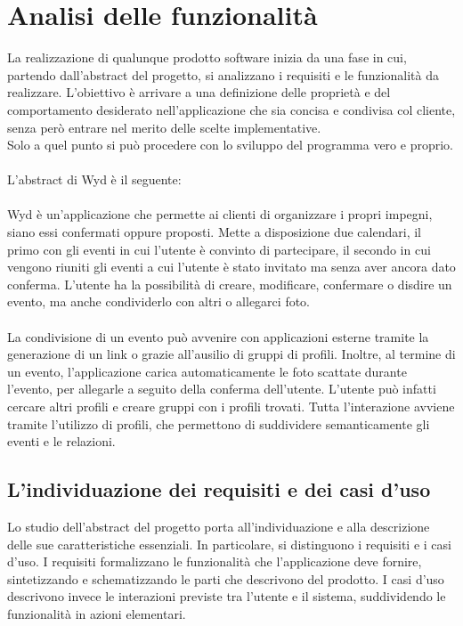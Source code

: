 \chapter{Analisi delle funzionalità}

La realizzazione di qualunque prodotto software inizia da una fase in cui,
partendo dall’abstract del progetto, si analizzano i requisiti e le funzionalità da realizzare.
L’obiettivo è arrivare a una definizione delle proprietà e
del comportamento desiderato nell’applicazione che sia concisa e condivisa col cliente,
senza però entrare nel merito delle scelte implementative.\\
Solo a quel punto si può procedere con lo sviluppo del programma vero e proprio.\\
\\
L'abstract di Wyd è il seguente:\\
\\
Wyd è un'applicazione che permette ai clienti di organizzare i propri impegni,
siano essi confermati oppure proposti.
Mette a disposizione due calendari,
il primo con gli eventi in cui l'utente è convinto di partecipare,
il secondo in cui vengono riuniti gli eventi a cui l'utente è stato invitato ma senza aver ancora dato conferma.
L'utente ha la possibilità di creare, modificare, confermare o disdire un evento,
ma anche condividerlo con altri o allegarci foto.\\
\\
La condivisione di un evento può avvenire con applicazioni esterne tramite la generazione di un link o
grazie all'ausilio di gruppi di profili.
Inoltre, al termine di un evento, l'applicazione carica automaticamente le foto scattate
durante l'evento, per allegarle a seguito della conferma dell'utente.
L'utente può infatti cercare altri profili e creare gruppi con i profili trovati.
Tutta l'interazione avviene tramite l'utilizzo di profili,
che permettono di suddividere semanticamente gli eventi e le relazioni.
\clearpage

\section{L'individuazione dei requisiti e dei casi d’uso}

Lo studio dell’abstract del progetto porta all’individuazione e
alla descrizione delle sue caratteristiche essenziali.
In particolare, si distinguono i requisiti e i casi d'uso.
I requisiti formalizzano le funzionalità che l'applicazione deve fornire,
sintetizzando e schematizzando le parti che descrivono del prodotto.
I casi d'uso descrivono invece le interazioni previste tra l'utente e il sistema,
suddividendo le funzionalità in azioni elementari.\\
